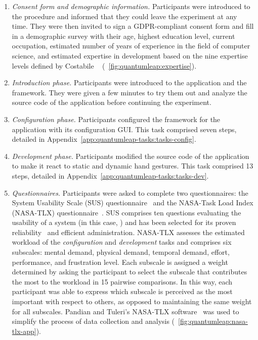 \begin{enumerate}
    \item \textit{Consent form and demographic information.} Participants were introduced to the procedure and informed that they could leave the experiment at any time. They were then invited to sign a GDPR-compliant consent form and fill in a demographic survey with their age, highest education level, current occupation, estimated number of years of experience in the field of computer science, and estimated expertise in development based on the nine expertise levels defined by Costabile \etal~\cite{Costabile:2008} (\fig~\ref{fig:quantumleap:expertise}).
    \item \textit{Introduction phase.} Participants were introduced to the application and the \ql framework. They were given a few minutes to try them out and analyze the source code of the application before continuing the experiment.
    \item \textit{Configuration phase.} Participants configured the \ql framework for the application with its configuration GUI. This task comprised seven steps, detailed in Appendix~\ref{app:quantumleap-tasks:tasks-config}.
    \item \textit{Development phase.} Participants modified the source code of the application to make it react to static and dynamic hand gestures. This task comprised 13 steps, detailed in Appendix~\ref{app:quantumleap-tasks:tasks-dev}.
    \item \textit{Questionnaires.} Participants were asked to complete two questionnaires: the System Usability Scale (SUS) questionnaire~\cite{Brooke:1996} and the NASA-Task Load Index (NASA-TLX) questionnaire~\cite{Hart:1988}. 
    SUS comprises ten questions evaluating the usability of a system (in this case, \ql) and has been selected for its proven reliability~\cite{Bangor:2008} and efficient administration. 
    NASA-TLX assesses the estimated workload of the \textit{configuration} and \textit{development} tasks and comprises six subscales: mental demand, physical demand, temporal demand, effort, performance, and frustration level. Each subscale is assigned a weight determined by asking the participant to select the subscale that contributes the most to the workload in 15 pairwise comparisons. In this way, each participant was able to express which subscale is perceived as the most important with respect to others, as opposed to maintaining the same weight for all subscales. Pandian and Tuleri's NASA-TLX software~\cite{Pandian:2020} was used to simplify the process of data collection and analysis (\fig~\ref{fig:quantumleap:nasa-tlx-app}).

\end{enumerate}
